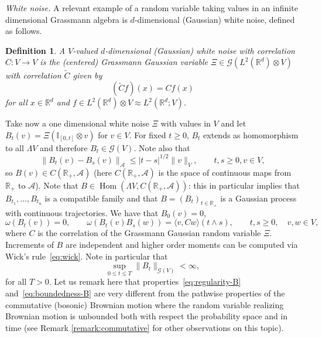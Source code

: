 \documentclass{article}
\newcommand{\tmop}[1]{\ensuremath{\operatorname{#1}}}
\newcommand{\tmtextit}[1]{{\itshape{#1}}}
\newtheorem{definition}[theorem]{Definition}
\begin{document}
\tmtextit{White noise.} A relevant example of a random variable taking values
in an infinite dimensional Grassmann algebra is $d$-dimensional (Gaussian)
white noise, defined as follows.

\begin{definition}
  \label{definition_Brownian}A $V$-valued $d$-dimensional (Gaussian) white
  noise with correlation $C : V \rightarrow V$ is the (centered) Grassmann
  Gaussian variable $\Xi \in \mathcal{G} (L^2 (\mathbb{R}^d) \otimes V)$ with
  correlation $\tilde{C}$ given by
  \[ (\tilde{C} f) (x) = C f (x) \]
  for all $x \in \mathbb{R}^d$ and $f \in L^2 (\mathbb{R}^d) \otimes V \approx
  L^2 (\mathbb{R}^d ; V)$.
\end{definition}

Take now a one dimensional white noise $\Xi$ with values in $V$ and let $B_t
(v) = \Xi (\mathbb{I}_{[0, t]} \otimes v)$ for $v \in V$. For fixed $t
\geqslant 0$, $B_t$ extends as homomorphism to all $\Lambda V$ and therefore
$B_t \in \mathcal{G} (V)$. Note also that
\begin{equation}
  \| B_t (v) - B_s (v) \|_{\mathcal{A}} \leqslant | t - s |^{1 / 2} \| v \|_V,
  \qquad t, s \geqslant 0, v \in V, \label{eq:regularity-B}
\end{equation}
so $B (v) \in C (\mathbb{R}_+, \mathcal{A})$ (here $C (\mathbb{R}_+,
\mathcal{A})$ is the space of continuous maps from $\mathbb{R}_+$ to
$\mathcal{A}$). Note that $B \in \tmop{Hom} (\Lambda V, C (\mathbb{R}_+,
\mathcal{A}))$: this in particular implies that $B_{t_1}, \ldots, B_{t_n}$ is
a compatible family and that $B = (B_t)_{t \in \mathbb{R}_+}$ is a Gaussian
process with continuous trajectories. We have that $B_0 (v) = 0$,
\[ \omega (B_t (v)) = 0, \qquad \omega (B_t (v) B_s (w)) = \langle v, C w
   \rangle  (t \wedge s), \qquad t, s \geqslant 0, \quad v, w \in V, \]
where $C$ is the correlation of the Grassmann Gaussian random variable $\Xi$.
Increments of $B$ are independent and higher order moments can be computed via
Wick's rule~{\eqref{eq:wick}}. Note in particular that
\begin{equation}
  \sup_{0 \leqslant t \leqslant T} \| B_t \|_{\mathcal{G} (V)} < \infty,
  \label{eq:boundedness-B}
\end{equation}
for all $T > 0$. Let us remark here that properties~{\eqref{eq:regularity-B}}
and~{\eqref{eq:boundedness-B}} are very different from the pathwise properties
of the commutative (bosonic) Brownian motion where the random variable
realizing Brownian motion is unbounded both with respect the probability space
and in time (see Remark \ref{remark:commutative} for other observations on
this topic).
\end{document}
